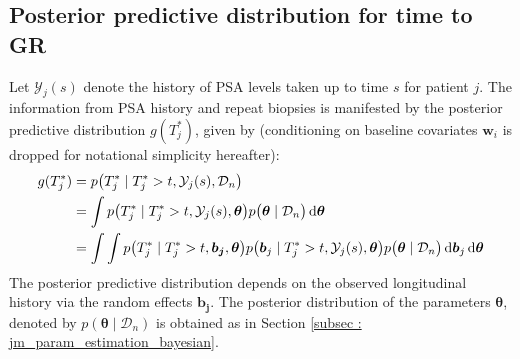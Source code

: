 
\subsection{Posterior predictive distribution for time to GR}
\label{subsec : ppd_time_to_GR}
Let $\mathcal{Y}_j(s)$ denote the history of PSA levels taken up to time $s$ for patient $j$. The information from PSA history and repeat biopsies is manifested by the posterior predictive distribution $g(T^*_j)$, given by (conditioning on baseline covariates $\boldsymbol{w}_i$ is dropped for notational simplicity hereafter):
\begin{equation}
\label{eq : dyn_dist_fail_time}
\begin{split}
g(T^*_j) &= p\big(T^*_j \mid T^*_j > t, \mathcal{Y}_j(s), \mathcal{D}_n\big)\\
&= \int p\big(T^*_j \mid T^*_j > t, \mathcal{Y}_j(s), \boldsymbol{\theta}\big) p\big(\boldsymbol{\theta} \mid \mathcal{D}_n\big) \mathop{}\!\mathrm{d} \boldsymbol{\theta}\\
&= \int \int p\big(T^*_j \mid T^*_j > t, \boldsymbol{b_j}, \boldsymbol{\theta}\big) p\big(\boldsymbol{b}_j \mid T^*_j>t, \mathcal{Y}_j(s), \boldsymbol{\theta}\big)p\big(\boldsymbol{\theta} \mid \mathcal{D}_n\big) \mathop{}\!\mathrm{d} \boldsymbol{b}_j \mathop{}\!\mathrm{d} \boldsymbol{\theta}
\end{split}
\end{equation}
The posterior predictive distribution depends on the observed longitudinal history via the random effects $\boldsymbol{b_j}$. The posterior distribution of the parameters $\boldsymbol{\theta}$, denoted by $p(\boldsymbol{\theta} \mid \mathcal{D}_n)$ is obtained as in Section \ref{subsec : jm_param_estimation_bayesian}.